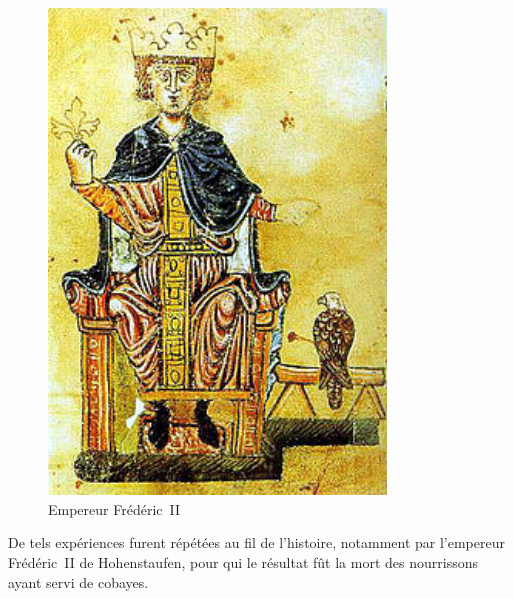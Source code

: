\begin{minipage}[H]{0.49\linewidth}
  \begin{figure}[H]
  \centering
  \includegraphics[width=0.8\textwidth]{../resources/illustrations/fred-II}
  \caption{Empereur Frédéric~II}
  \end{figure}
\end{minipage}
\begin{minipage}[H]{0.5\linewidth}
De tels expériences furent répétées au fil de l'histoire, notamment
par l'empereur Frédéric~II de Hohenstaufen, pour qui le résultat fût
la mort des nourrissons ayant servi de cobayes\cite{ggcoulton-francis-to-dante}. 
\end{minipage}

